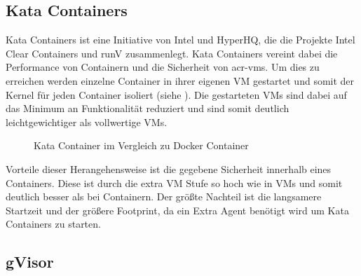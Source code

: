\subsection{Kata Containers}
\label{sec:compVMbasedKata}

Kata Containers ist eine Initiative von Intel und HyperHQ, die die Projekte Intel Clear Containers und runV zusammenlegt. Kata Containers vereint dabei die Performance von Containern und die Sicherheit von \glspl{acr-vm}. Um dies zu erreichen werden einzelne Container in ihrer eigenen VM gestartet und somit der Kernel für jeden Container isoliert (siehe ). Die gestarteten VMs sind dabei auf das Minimum an Funktionalität reduziert und sind somit deutlich leichtgewichtiger als vollwertige VMs.

\begin{figure}[h]
	\hfill
	\caption{Kata Container im Vergleich zu Docker Container}
	\label{fig:kataContainers}
\end{figure}

Vorteile dieser Herangehensweise ist die gegebene Sicherheit innerhalb eines Containers. Diese ist durch die extra VM Stufe so hoch wie in VMs und somit deutlich besser als bei Containern. Der größte Nachteil ist die langsamere Startzeit und der größere Footprint, da ein Extra Agent benötigt wird um Kata Containers zu starten.

\subsection{gVisor}
\label{sec:compVMbasedGVisor}

